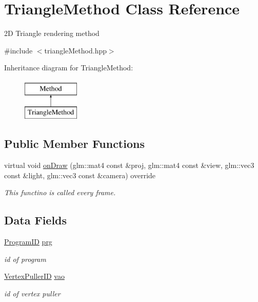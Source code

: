 \hypertarget{classTriangleMethod}{}\section{Triangle\+Method Class Reference}
\label{classTriangleMethod}


2D Triangle rendering method  




{\ttfamily \#include $<$triangle\+Method.\+hpp$>$}

Inheritance diagram for Triangle\+Method\+:\begin{figure}[H]
\begin{center}
\leavevmode
\includegraphics[height=2.000000cm]{classTriangleMethod}
\end{center}
\end{figure}
\subsection*{Public Member Functions}
\begin{DoxyCompactItemize}
\item 
virtual void \hyperlink{classTriangleMethod_a92fa9c2070469055edee05594a8639c9}{on\+Draw} (glm\+::mat4 const \&proj, glm\+::mat4 const \&view, glm\+::vec3 const \&light, glm\+::vec3 const \&camera) override
\begin{DoxyCompactList}\small\item\em This functino is called every frame. \end{DoxyCompactList}\end{DoxyCompactItemize}
\subsection*{Data Fields}
\begin{DoxyCompactItemize}
\item 
\mbox{\label{classTriangleMethod_afe56337e65b4f2b2e81c236274ea1e81}} 
\hyperlink{fwd_8hpp_a46ffd067c21ab50f5f1fcfed5d8bfc15}{Program\+ID} \hyperlink{classTriangleMethod_afe56337e65b4f2b2e81c236274ea1e81}{prg}
\begin{DoxyCompactList}\small\item\em id of program \end{DoxyCompactList}\item 
\mbox{\label{classTriangleMethod_a24b12b7de04a0acd1148632f6d1f1ec3}} 
\hyperlink{fwd_8hpp_af6f78f73099477c9ce5537d657597486}{Vertex\+Puller\+ID} \hyperlink{classTriangleMethod_a24b12b7de04a0acd1148632f6d1f1ec3}{vao}
\begin{DoxyCompactList}\small\item\em id of vertex puller \end{DoxyCompactList}\end{DoxyCompactItemize}



